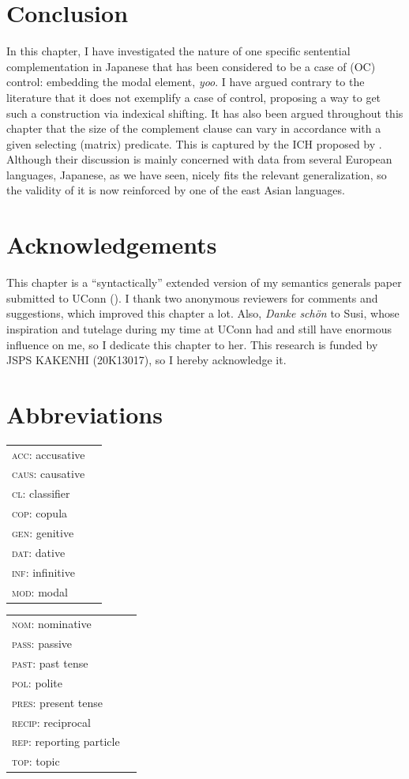 \documentclass[output=paper]{langsci/langscibook}
\begin{document}
\section{Conclusion}\label{shimamuS6}
In this chapter, I have investigated the nature of one specific sentential complementation in Japanese that has been considered to be a case of (OC) control: embedding the modal element, \textit{yoo}. I have argued contrary to the literature that it does not exemplify a case of control, proposing a way to get such a construction via indexical shifting. It has also been argued throughout this chapter that the size of the complement clause can vary in accordance with a given selecting (matrix) predicate. This is captured by the ICH proposed by \citet{wurmbrandlohninger2020}. Although their discussion is mainly concerned with data from several European languages, Japanese, as we have seen, nicely fits the relevant generalization, so the validity of it is now reinforced by one of the east Asian languages. 

\section*{Acknowledgements}

This chapter is a ``syntactically'' extended version of my semantics generals paper submitted to UConn (\citealt{shimamura2015}). I thank two anonymous reviewers for comments and suggestions, which improved this chapter a lot. Also, \textit{Danke schön} to Susi, whose inspiration and tutelage during my time at UConn had and still have enormous influence on me, so I dedicate this chapter to her. This research is funded by JSPS KAKENHI (20K13017), so I hereby acknowledge it. 

\section*{Abbreviations}
\begin{tabularx}{.45\textwidth}{lQ}
\textsc{acc}: accusative & \\
\textsc{caus}: causative & \\
\textsc{cl}: classifier & \\
\textsc{cop}: copula & \\
\textsc{gen}: genitive & \\
\textsc{dat}: dative & \\
\textsc{inf}: infinitive & \\
\textsc{mod}: modal & \\
\end{tabularx}
\begin{tabularx}{.45\textwidth}{lQ}
\textsc{nom}: nominative & \\
\textsc{pass}: passive & \\
\textsc{past}: past tense & \\
\textsc{pol}: polite & \\
\textsc{pres}: present tense & \\
\textsc{recip}: reciprocal & \\
\textsc{rep}: reporting particle & \\
\textsc{top}: topic & \\
\end{tabularx}

\printbibliography[heading=subbibliography,notkeyword=this]
\end{document}
